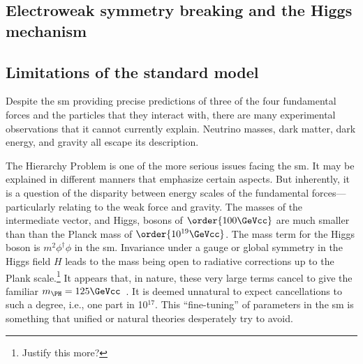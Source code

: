 



\subsection{Electroweak symmetry breaking and the Higgs mechanism}
\label{subsec:theory_higgs_mechanism}




\subsection{Limitations of the standard model}
\label{subsec:sm_limitations}


Despite the \acrlong{sm} providing precise predictions of three of the four fundamental forces and the particles that they interact with, there are many experimental observations that it cannot currently explain. Neutrino masses, dark matter, dark energy, and gravity all escape its description.

The Hierarchy Problem is one of the more serious issues facing the \acrlong{sm}. It may be explained in different manners that emphasize certain aspects. But inherently, it is a question of the disparity between energy scales of the fundamental forces---particularly relating to the weak force and gravity. The masses of the intermediate vector, and Higgs, bosons of $\order{\text{100}\GeVcc}$ are much smaller than than the Planck mass of $\order{\text{10}^{19}\GeVcc}$. The mass term for the Higgs boson is $m^2 \phi^{\dagger} \phi$ in the \acrshort{sm}. Invariance under a gauge or global symmetry in the Higgs field $H$ leads to the mass being open to radiative corrections up to the Plank scale.\footnote{Justify this more?} It appears that, in nature, these very large terms cancel to give the familiar $m_{\PH} = \text{125}\GeVcc$~\cite{Chatrchyan:2012xdj,Aad:2012tfa}. It is deemed unnatural to expect cancellations to such a degree, i.e., one part in 10$^{17}$. This ``fine-tuning'' of parameters in the \acrlong{sm} is something that unified or natural theories desperately try to avoid.


